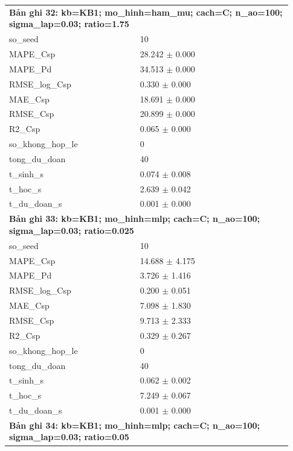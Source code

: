 \begin{longtable}{p{0.43\linewidth}p{0.50\linewidth}}
\midrule
\multicolumn{2}{p{0.95\linewidth}}{\textbf{Bản ghi 32: kb=KB1; mo\_hinh=ham\_mu; cach=C; n\_ao=100; sigma\_lap=0.03; ratio=1.75}} \\
so\_\allowbreak seed & 10 \\
MAPE\_\allowbreak Csp & 28.242 $\pm$ 0.000 \\
MAPE\_\allowbreak Pd & 34.513 $\pm$ 0.000 \\
RMSE\_\allowbreak log\_\allowbreak Csp & 0.330 $\pm$ 0.000 \\
MAE\_\allowbreak Csp & 18.691 $\pm$ 0.000 \\
RMSE\_\allowbreak Csp & 20.899 $\pm$ 0.000 \\
R2\_\allowbreak Csp & 0.065 $\pm$ 0.000 \\
so\_\allowbreak khong\_\allowbreak hop\_\allowbreak le & 0 \\
tong\_\allowbreak du\_\allowbreak doan & 40 \\
t\_\allowbreak sinh\_\allowbreak s & 0.074 $\pm$ 0.008 \\
t\_\allowbreak hoc\_\allowbreak s & 2.639 $\pm$ 0.042 \\
t\_\allowbreak du\_\allowbreak doan\_\allowbreak s & 0.001 $\pm$ 0.000 \\
\midrule
\multicolumn{2}{p{0.95\linewidth}}{\textbf{Bản ghi 33: kb=KB1; mo\_hinh=mlp; cach=C; n\_ao=100; sigma\_lap=0.03; ratio=0.025}} \\
so\_\allowbreak seed & 10 \\
MAPE\_\allowbreak Csp & 14.688 $\pm$ 4.175 \\
MAPE\_\allowbreak Pd & 3.726 $\pm$ 1.416 \\
RMSE\_\allowbreak log\_\allowbreak Csp & 0.200 $\pm$ 0.051 \\
MAE\_\allowbreak Csp & 7.098 $\pm$ 1.830 \\
RMSE\_\allowbreak Csp & 9.713 $\pm$ 2.333 \\
R2\_\allowbreak Csp & 0.329 $\pm$ 0.267 \\
so\_\allowbreak khong\_\allowbreak hop\_\allowbreak le & 0 \\
tong\_\allowbreak du\_\allowbreak doan & 40 \\
t\_\allowbreak sinh\_\allowbreak s & 0.062 $\pm$ 0.002 \\
t\_\allowbreak hoc\_\allowbreak s & 7.249 $\pm$ 0.067 \\
t\_\allowbreak du\_\allowbreak doan\_\allowbreak s & 0.001 $\pm$ 0.000 \\
\midrule
\multicolumn{2}{p{0.95\linewidth}}{\textbf{Bản ghi 34: kb=KB1; mo\_hinh=mlp; cach=C; n\_ao=100; sigma\_lap=0.03; ratio=0.05}} \\

\end{longtable}
